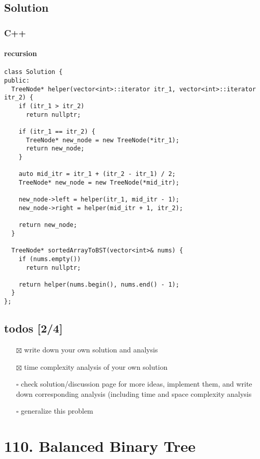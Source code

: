 \documentclass[11pt]{article}
\begin{document}
\subsection{Solution}
\label{sec:org4c0d10a}
\subsubsection{C++}
\label{sec:orgbb8045d}
\paragraph{recursion}
\label{sec:org4046267}
\begin{verbatim}
class Solution {
public:
  TreeNode* helper(vector<int>::iterator itr_1, vector<int>::iterator itr_2) {
    if (itr_1 > itr_2)
      return nullptr;

    if (itr_1 == itr_2) {
      TreeNode* new_node = new TreeNode(*itr_1);
      return new_node;
    }

    auto mid_itr = itr_1 + (itr_2 - itr_1) / 2;
    TreeNode* new_node = new TreeNode(*mid_itr);

    new_node->left = helper(itr_1, mid_itr - 1);
    new_node->right = helper(mid_itr + 1, itr_2);

    return new_node;
  }

  TreeNode* sortedArrayToBST(vector<int>& nums) {
    if (nums.empty())
      return nullptr;

    return helper(nums.begin(), nums.end() - 1);
  }
};
\end{verbatim}
\subsection{todos [2/4]}
\label{sec:orgc4b987b}
\begin{itemize}
\item[{$\boxtimes$}] write down your own solution and analysis
\item[{$\boxtimes$}] time complexity analysis of your own solution
\item[{$\square$}] check solution/discussion page for more ideas, implement them, and write down corresponding analysis (including time and space complexity analysis
\item[{$\square$}] generalize this problem
\end{itemize}
\section{110. Balanced Binary Tree}
\label{sec:orgb3d825f}
\end{document}
